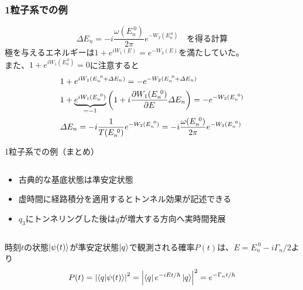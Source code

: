 \documentclass[14pt,aspectratio=169,xcolor=dvipsnames,table,dvipdfmx]{beamer}
\theoremstyle{definition}
\begin{document}
\begin{frame}
  \frametitle{1粒子系での例}
  \begin{equation*}
    \varDelta E_n = -i\frac{\omega(E_n^{~0})}{2\pi}e^{-W_2(E_n^{~0})}\quad\text{を得る計算}
  \end{equation*}
  極を与えるエネルギーは$1+e^{iW_1(E)}=e^{-W_2(E)}$を満たしていた。\\
  また、$1+e^{iW_1(E_n^{~0})}=0$に注意すると
  \begin{align*}
     & 1+e^{iW_1(E_n^{~0}+\varDelta E_n)}=-e^{-W_2(E_n^{~0}+\varDelta E_n)}                                          \\
     & 1+\underbrace{e^{iW_1(E_n^{~0})}}_{=-1}\qty(1+i\pdv{W_1(E_n^{~0})}{E}\varDelta E_n) = -e^{-W_2(E_n^{~0})}     \\
     & \varDelta E_n = -i\frac{1}{T(E_n^{~0})}e^{-W_2(E_n^{~0})} = -i\frac{\omega(E_n^{~0})}{2\pi}e^{-W_2(E_n^{~0})}
  \end{align*}



\end{frame}

\begin{frame}{1粒子系での例（まとめ）}
  \begin{columns}[t]
    \begin{column}{.5\textwidth}
      \begin{itemize}
        \item 古典的な基底状態は準安定状態
        \item 虚時間に経路積分を適用するとトンネル効果が記述できる
        \item $q_3$にトンネリングした後は$q$が増大する方向へ実時間発展
      \end{itemize}
    \end{column}
    \begin{column}{.5\textwidth}
    \end{column}
  \end{columns}
  時刻$t$の状態$\ket{\psi(t)}$が準安定状態$\ket{q}$で観測される確率$P(t)$は、$E=E_n^{~0}-i\Gamma_n/2$より
  \begin{equation*}
    P(t) = \abs{\braket{q}{\psi(t)}}^2 = \abs{\bra{q}e^{-iEt/\hbar}\ket{q}}^2 = e^{-\Gamma_nt/\hbar}
  \end{equation*}
\end{frame}
\end{document}
